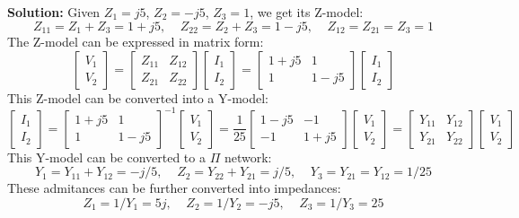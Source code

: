 {\bf Solution:} Given $Z_1=j5$, $Z_2=-j5$, $Z_3=1$, we get its Z-model:
\[  Z_{11}=Z_1+Z_3=1+j5,\;\;\;\;Z_{22}=Z_2+Z_3=1-j5,\;\;\;\;Z_{12}=Z_{21}=Z_3=1 \]
The Z-model can be expressed in matrix form:
\[	\left[ \begin{array}{l} V_1 \\ V_2\end{array} \right]=
	\left[ \begin{array}{cc} Z_{11} & Z_{12} \\ Z_{21} & Z_{22} \end{array} \right]
	\left[ \begin{array}{l} I_1 \\ I_2\end{array} \right]
=	\left[ \begin{array}{cc} 1+j5 & 1 \\ 1 & 1-j5 \end{array} \right]
	\left[ \begin{array}{l} I_1 \\ I_2\end{array} \right]
\]
This Z-model can be converted into a Y-model:
\[	\left[ \begin{array}{l} I_1 \\ I_2\end{array} \right]=
	\left[ \begin{array}{cc} 1+j5 & 1 \\ 1 & 1-j5 \end{array} \right]^{-1}
	\left[ \begin{array}{l} V_1 \\ V_2\end{array} \right]
=\frac{1}{25}
	\left[ \begin{array}{cc} 1-j5 & -1 \\ -1 & 1+j5 \end{array} \right]
	\left[ \begin{array}{l} V_1 \\ V_2\end{array} \right]
=	\left[ \begin{array}{cc} Y_{11} & Y_{12} \\ Y_{21} & Y_{22} \end{array} \right]
	\left[ \begin{array}{l} V_1 \\ V_2\end{array} \right]
\]
This Y-model can be converted to a $\Pi$ network:
\[ Y_1=Y_{11}+Y_{12}=-j/5,\;\;\;\;Z_2=Y_{22}+Y_{21}=j/5,\;\;\;\;Y_3=Y_{21}=Y_{12}=1/25 \]
These admitances can be further converted into impedances:
\[ Z_1=1/Y_1=5j,\;\;\;\;Z_2=1/Y_2=-j5,\;\;\;\;Z_3=1/Y_3=25	\]

